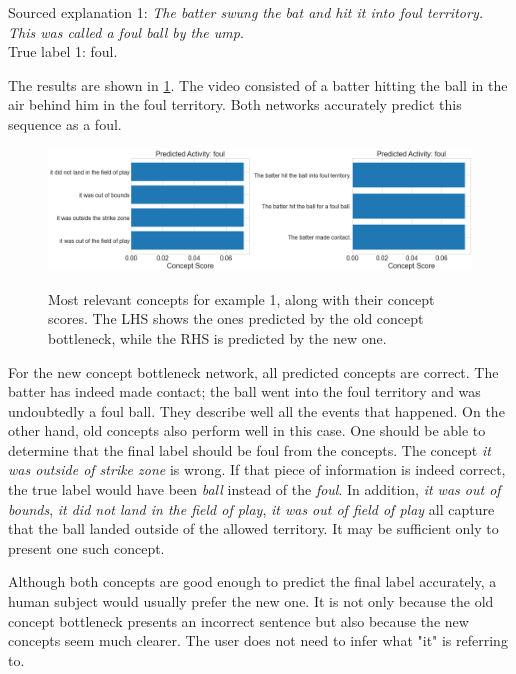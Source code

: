 Sourced explanation 1: \emph{The batter swung the bat and hit it into foul territory. This was called a foul ball by the ump}. \\
True label 1: foul.

The results are shown in \ref{concepts-results-1}.
The video consisted of a batter hitting the ball in the air behind him in the foul territory.
Both networks accurately predict this sequence as a foul.

\begin{figure}[h]
\caption{Most relevant concepts for example 1, along with their concept scores. The LHS shows the ones predicted by the old concept bottleneck, while the RHS is predicted by the new one.}
\centering
\includegraphics[width=\textwidth]{concept-bottleneck-pipeline/explanations_concepts1.png}
\label{concepts-results-1}
\end{figure}

For the new concept bottleneck network, all predicted concepts are correct.
The batter has indeed made contact; the ball went into the foul territory and was undoubtedly a foul ball.
They describe well all the events that happened.
On the other hand, old concepts also perform well in this case.
One should be able to determine that the final label should be foul from the concepts. 
The concept \emph{it was outside of strike zone} is wrong. 
If that piece of information is indeed correct, the true label would have been \emph{ball} instead of the \emph{foul}.
In addition, \emph{it was out of bounds}, \emph{it did not land in the field of play}, \emph{it was out of field of play} all capture that the ball landed outside of the allowed territory.
It may be sufficient only to present one such concept.

Although both concepts are good enough to predict the final label accurately, a human subject would usually prefer the new one.
It is not only because the old concept bottleneck presents an incorrect sentence but also because the new concepts seem much clearer.
The user does not need to infer what "it" is referring to. \\

